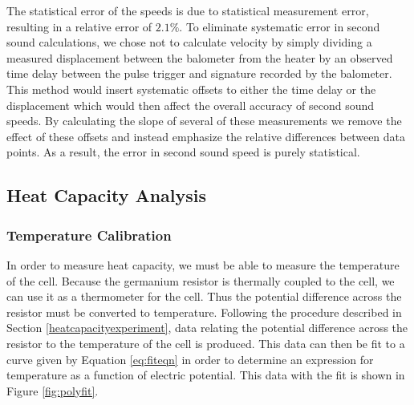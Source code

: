 The statistical error of the speeds is due to statistical measurement error, resulting in a relative error of $2.1\%$. To eliminate systematic error in second sound calculations, we chose not to calculate velocity by simply dividing a measured displacement between the balometer from the heater by an observed time delay between the pulse trigger and signature recorded by the balometer. This method would insert systematic offsets to either the time delay or the displacement which would then affect the overall accuracy of second sound speeds.  By calculating the slope of several of these measurements we remove the effect of these offsets and instead emphasize the relative differences between data points.  As a result, the error in second sound speed is purely statistical.

\subsection{Heat Capacity Analysis}\label{heatcapacityanalysis}
\subsubsection{Temperature Calibration}\label{temperaturecalibration}

In order to measure heat capacity, we must be able to measure the temperature of the cell.  Because the germanium resistor is thermally coupled to the cell, we can use it as a thermometer for the cell.  Thus the potential difference across the resistor must be converted to temperature.  Following the procedure described in Section \ref{heatcapacityexperiment}, data relating the potential difference across the resistor to the temperature of the cell is produced.  This data can then be fit to a curve given by Equation \ref{eq:fiteqn} in order to determine an expression for temperature as a function of electric potential.  This data with the fit is shown in Figure \ref{fig:polyfit}.  

